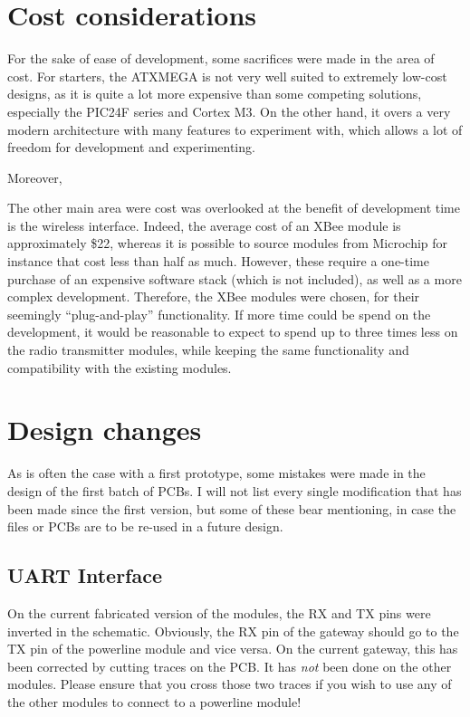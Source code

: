 \section{Cost considerations}

For the sake of ease of development, some sacrifices were made in the area of
cost. For starters, the ATXMEGA is not very well suited to extremely low-cost
designs, as it is quite a lot more expensive than some competing solutions,
especially the PIC24F series and Cortex M3. On the other hand, it overs a very
modern architecture with many features to experiment with, which allows a lot of
freedom for development and experimenting.

Moreover,

The other main area were cost was overlooked at the benefit of development time
is the wireless interface. Indeed, the average cost of an XBee module is
approximately \$22, whereas it is possible to source modules from Microchip for
instance that cost less than half as much. However, these require a one-time
purchase of an expensive software stack (which is not included), as well as a
more complex development. Therefore, the XBee modules were chosen, for their
seemingly ``plug-and-play'' functionality. If more time could be spend on the
development, it would be reasonable to expect to spend up to three times less on
the radio transmitter modules, while keeping the same functionality and
compatibility with the existing modules.

\section{Design changes}
\label{sec:design-changes}

As is often the case with a first prototype, some mistakes were made in the
design of the first batch of PCBs. I will not list every single modification
that has been made since the first version, but some of these bear mentioning,
in case the files or PCBs are to be re-used in a future design.

\subsection{UART Interface}
On the current fabricated version of the modules, the RX and TX pins were
inverted in the schematic. Obviously, the RX pin of the gateway should go to the
TX pin of the powerline module and vice versa. On the current gateway, this has
been corrected by cutting traces on the PCB. It has \emph{not} been done on the
other modules. Please ensure that you cross those two traces if you wish to use
any of the other modules to connect to a powerline module!

